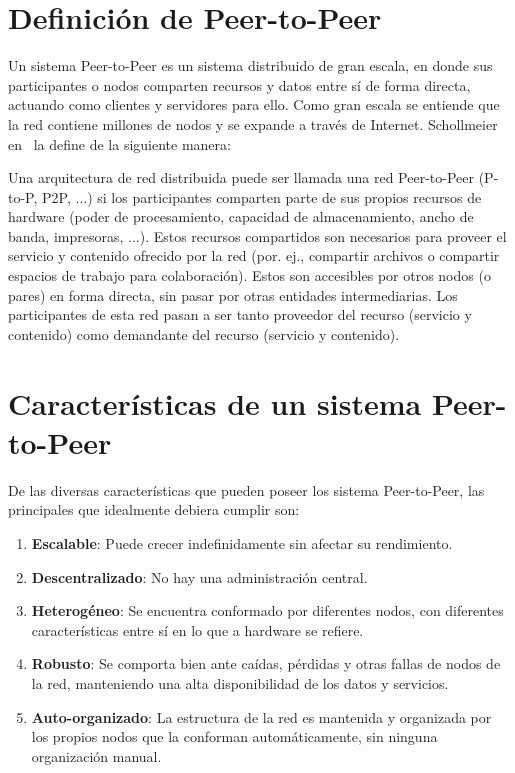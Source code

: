 

\section{Definición de Peer-to-Peer}
\label{sec:p2p_definition}

Un sistema Peer-to-Peer es un sistema distribuido de gran escala, en donde sus participantes o
nodos comparten recursos y datos entre sí de forma directa, actuando como
clientes y servidores para ello. Como gran escala se entiende que la red
contiene millones de nodos y se expande a través de Internet. Schollmeier en~\cite{conf_p2p_Schollmeier01} la define de la siguiente manera:

\begin{mydef}
Una arquitectura de red
distribuida puede ser llamada una red Peer-to-Peer (P-to-P, P2P, ...) si los
participantes comparten parte de sus propios recursos de hardware (poder de
procesamiento, capacidad de almacenamiento, ancho de banda, impresoras, ...).
Estos recursos compartidos son necesarios para proveer el servicio y contenido
ofrecido por la red (por. ej., compartir archivos o compartir espacios de
trabajo para colaboración). Estos son accesibles por otros nodos (o pares) en forma
directa, sin pasar por otras entidades intermediarias. Los participantes de
esta red pasan a ser tanto proveedor del recurso (servicio y contenido) como
demandante del recurso (servicio y contenido).
\end{mydef}

\section{Características de un sistema Peer-to-Peer}
\label{sec:p2p_characteristics}

De las diversas características que pueden poseer los sistema Peer-to-Peer, las
principales que idealmente debiera cumplir son:
\begin{enumerate}
    \item \textbf{Escalable}: Puede crecer indefinidamente sin afectar su rendimiento.
    \item \textbf{Descentralizado}: No hay una administración central.
    \item \textbf{Heterogéneo}: Se encuentra conformado por diferentes nodos, con
diferentes características  entre sí en lo que a hardware se refiere. 
    \item \textbf{Robusto}: Se comporta bien ante caídas, pérdidas y otras
fallas de nodos de la red, manteniendo una alta disponibilidad de los datos y
servicios.
    \item \textbf{Auto-organizado}: La estructura de la red es mantenida y
organizada por los propios nodos que la conforman automáticamente, sin ninguna organización manual.
\end{enumerate}

